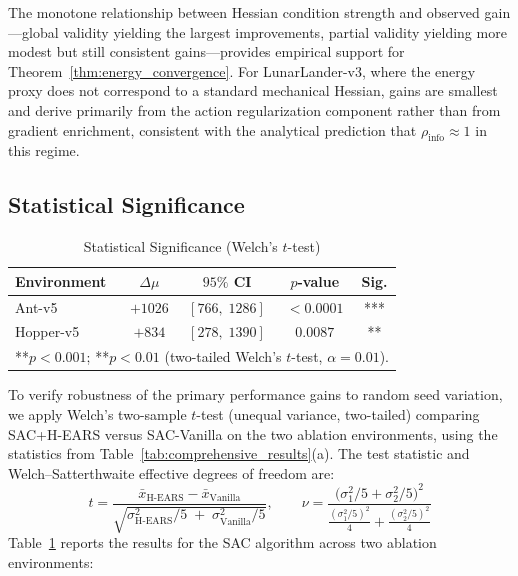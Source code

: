 \documentclass[journal]{IEEEtran}
\begin{document}
	The monotone relationship between Hessian condition strength and observed gain---global validity yielding the largest improvements, partial validity yielding more modest but still consistent gains---provides empirical support for Theorem~\ref{thm:energy_convergence}. For LunarLander-v3, where the energy proxy does not correspond to a standard mechanical Hessian, gains are smallest and derive primarily from the action regularization component rather than from gradient enrichment, consistent with the analytical prediction that $\rho_{\text{info}} \approx 1$ in this regime.
	
	\subsection{Statistical Significance}
	
	\begin{table}[htbp]
		\renewcommand{\arraystretch}{1.2}
		\captionsetup{font=footnotesize, labelfont=footnotesize}
		\caption{Statistical Significance (Welch's $t$-test)}
		\label{tab:statistical_significance}
		\centering
		\footnotesize
		\begin{tabular}{lcccc}
			\toprule
			\textbf{Environment} & $\Delta\mu$ & $95\%$ CI & $p$-value & Sig. \\
			\midrule
			Ant-v5    & $+1026$ & $[766,\;1286]$ & $<0.0001$ & *** \\
			Hopper-v5 & $+834$  & $[278,\;1390]$ & $0.0087$  & **  \\
			\bottomrule
			\multicolumn{5}{l}{\scriptsize ***$p<0.001$; **$p<0.01$ (two-tailed Welch's $t$-test, $\alpha=0.01$).}
		\end{tabular}
	\end{table}
	
	To verify robustness of the primary performance gains to random seed variation, we apply Welch's two-sample $t$-test (unequal variance, two-tailed) comparing SAC+H-EARS versus SAC-Vanilla on the two ablation environments, using the statistics from Table~\ref{tab:comprehensive_results}(a). The test statistic and Welch--Satterthwaite effective degrees of freedom are:
	\begin{equation}
		t = \frac{\bar{x}_{\text{H-EARS}} - \bar{x}_{\text{Vanilla}}}{\sqrt{\sigma_{\text{H-EARS}}^2/5\;+\;\sigma_{\text{Vanilla}}^2/5}}, \qquad
		\nu = \frac{\bigl(\sigma_1^2/5+\sigma_2^2/5\bigr)^2}{\frac{(\sigma_1^2/5)^2}{4}+\frac{(\sigma_2^2/5)^2}{4}}
	\end{equation}
	Table~\ref{tab:statistical_significance} reports the results for the SAC algorithm across two ablation environments:
	
\end{document}
